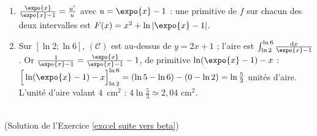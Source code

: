 \begin{corrige}
\begin{sol}
\begin{enumerate}
\begin{enumerate}
      \item $\frac{\expo{x}}{\expo{x}-1} = \frac{u'}{u}$ avec $u = \expo{x} - 1$ : une primitive de $f$ sur chacun des deux intervalles est
            $F(x) = x^2 + \ln\left|\expo{x} - 1\right|$.
      \item Sur $[\ln 2;\ln 6]$, $(\mathcal{C})$ est au-dessus de $y = 2x + 1$ ; l'aire est
            $\int_{\ln 2}^{\ln 6} \frac{\mathrm{d}x}{\expo{x}-1}$. Or $\frac{1}{\expo{x}-1} = \frac{\expo{x}}{\expo{x}-1} - 1$, de primitive $\ln(\expo{x}-1) - x$ :
            $\Big[\ln(\expo{x}-1) - x\Big]_{\ln 2}^{\ln 6} = (\ln 5 - \ln 6) - (0 - \ln 2) = \ln\frac{5}{3}$ unit\'es d'aire.
            L'unit\'e d'aire valant $4$~cm$^2$ : $\boxed{4\ln\frac{5}{3} \simeq 2{,}04 \text{ cm}^2}$.
      \end{enumerate}
\end{enumerate}
\end{sol}

\begin{sol} ~ \\
(Solution de l'Exercice \ref{exo:el suite vers beta})


\end{sol}
\end{corrige}
